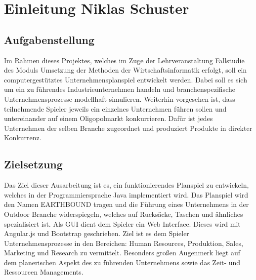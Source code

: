 \chapter{Einleitung \textnormal{\textsf{\small{Niklas Schuster}}}}
\section{Aufgabenstellung}
Im Rahmen dieses Projektes, welches im Zuge der Lehrveranstaltung Fallstudie des Moduls Umsetzung der Methoden der Wirtschaftsinformatik erfolgt, soll ein computergestütztes Unternehmensplanspiel entwickelt werden. Dabei soll es sich um ein zu führendes Industrieunternehmen handeln und branchenspezifische Unternehmensprozesse modellhaft simulieren. Weiterhin vorgesehen ist, dass teilnehmende Spieler jeweils ein einzelnes Unternehmen führen sollen und untereinander auf einem Oligopolmarkt konkurrieren. Dafür ist jedes Unternehmen der selben Branche zugeordnet und produziert Produkte in direkter Konkurrenz.
\section{Zielsetzung}
Das Ziel dieser Ausarbeitung ist es, ein funktionierendes Planspiel zu entwickeln, welches in der Programmiersprache Java implementiert wird. Das Planspiel wird den Namen EARTHBOUND tragen und die Führung eines Unternehmens in der Outdoor Branche widerspiegeln, welches auf Rucksäcke, Taschen und ähnliches spezialisiert ist. Als GUI dient dem Spieler ein Web Interface. Dieses wird mit Angular.js und Bootstrap geschrieben. Ziel ist es dem Spieler Unternehmensprozesse in den Bereichen: Human Resources, Produktion, Sales, Marketing und Research zu vermittelt. Besonders großen Augenmerk liegt auf dem planerischen Aspekt des zu führenden Unternehmens sowie das Zeit- und Ressourcen Managements.
